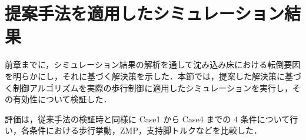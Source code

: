 \chapter{提案手法を適用したシミュレーション結果}

前章までに，シミュレーション結果の解析を通して沈み込み床における転倒要因を明らかにし，それに基づく解決策を示した．本節では，提案した解決策に基づく制御アルゴリズムを実際の歩行制御に適用したシミュレーションを実行し，その有効性について検証した．

評価は，従来手法の検証時と同様に Case1 から Case4 までの 4 条件について行い，各条件における歩行挙動，ZMP，支持脚トルクなどを比較した．


